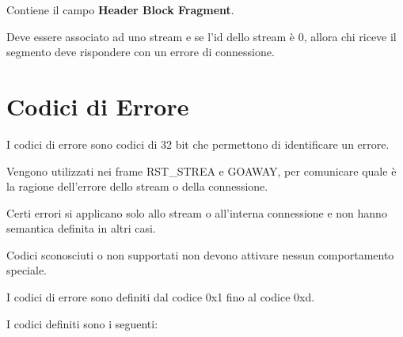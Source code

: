 \documentclass[12pt, a4paper]{article} %
\begin{document}
Contiene il campo \textbf{Header Block Fragment}.

Deve essere associato ad uno stream e se l'id dello stream è 0, allora chi riceve il segmento deve rispondere con un errore di connessione.

\section{Codici di Errore}
I codici di errore sono codici di 32 bit che permettono di identificare un errore.

Vengono utilizzati nei frame RST\_STREA e GOAWAY, per comunicare quale è la ragione dell'errore dello stream o della connessione.

Certi errori si applicano solo allo stream o all'interna connessione e non hanno semantica definita in altri casi.

Codici sconosciuti o non supportati non devono attivare nessun comportamento speciale.

I codici di errore sono definiti dal codice 0x1 fino al codice 0xd.

I codici definiti sono i seguenti:
\end{document}

